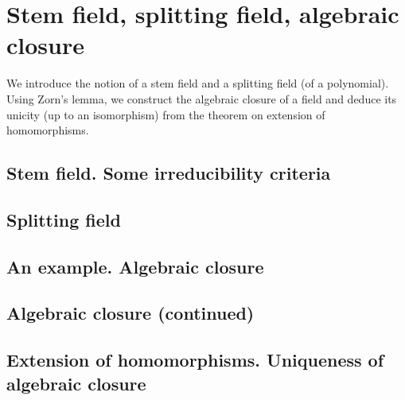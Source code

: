 \chapter{Stem field, splitting field, algebraic closure}
We introduce the notion of a stem field and a splitting field (of a
polynomial). Using Zorn's lemma, we construct the algebraic closure of
a field and deduce its unicity (up to an isomorphism) from the theorem
on extension of homomorphisms.

\section{Stem field. Some irreducibility criteria}

\section{Splitting field}

\section{An example. Algebraic closure}

\section{Algebraic closure (continued)}

\section{Extension of homomorphisms. Uniqueness of algebraic closure}
